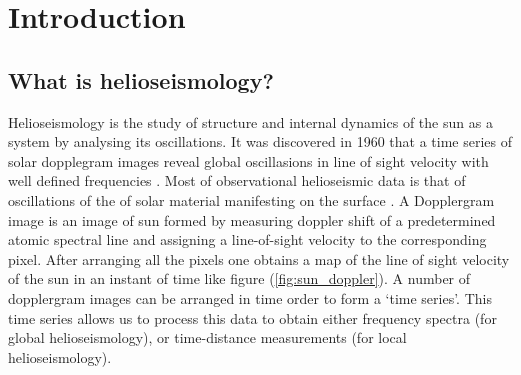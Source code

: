 
\chapter{Introduction}  %

\ifpdf
    \graphicspath{{Chapter1/Figs/Raster/}{Chapter1/Figs/PDF/}{Chapter1/Figs/}}
\else
    \graphicspath{{Chapter1/Figs/Vector/}{Chapter1/Figs/}}
\fi


\section{What is helioseismology?} %
Helioseismology is the study of structure and internal dynamics of the sun as a system by analysing its oscillations. It was discovered in 1960 that a time series of solar dopplegram images reveal global oscillasions in line of sight velocity with well defined frequencies \cite{Kosovichev2011}. Most of observational helioseismic data is that of oscillations of the of solar material manifesting on the surface \cite{jcd_notes}. A Dopplergram image is an image of sun formed by measuring doppler shift of a predetermined atomic spectral line and assigning a line-of-sight velocity to the corresponding pixel. After arranging all the pixels one obtains a map of the line of sight velocity of the sun in an instant of time like figure (\ref{fig:sun_doppler}). A number of dopplergram images can be arranged in time order to form a `time series'. This time series allows us to process this data to obtain either frequency spectra (for global helioseismology), or time-distance measurements (for local helioseismology).

